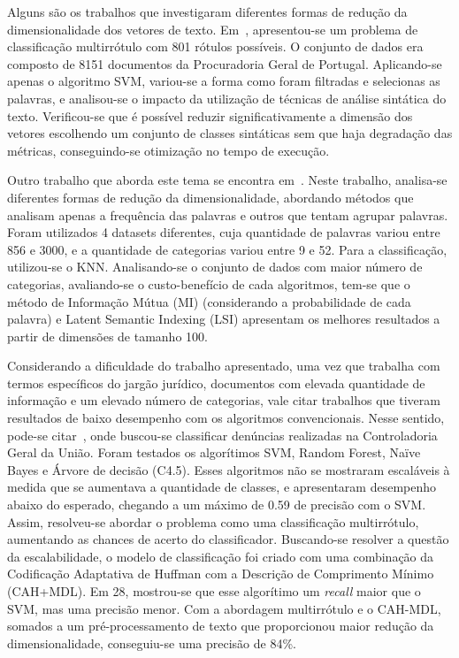 

Alguns são os trabalhos que investigaram diferentes formas de redução da dimensionalidade dos vetores de texto. Em~\cite{goncalves_is_2005}, apresentou-se um problema de classificação multirrótulo com 801 rótulos possíveis. O conjunto de dados era composto de 8151 documentos da Procuradoria Geral de Portugal. Aplicando-se apenas o algoritmo SVM, variou-se a forma como foram filtradas e selecionas as palavras, e analisou-se o impacto da utilização de técnicas de análise sintática do texto. Verificou-se que é possível reduzir significativamente a dimensão dos vetores escolhendo um conjunto de classes sintáticas sem que haja degradação das métricas, conseguindo-se otimização no tempo de execução. 

Outro trabalho que aborda este tema se encontra em~\cite{ciarelli_agglomeration_2009}. Neste trabalho, analisa-se diferentes formas de redução da dimensionalidade, abordando métodos que analisam apenas a frequência das palavras e outros que tentam agrupar palavras. Foram utilizados 4 datasets diferentes, cuja quantidade de palavras variou entre 856 e 3000, e a quantidade de categorias variou entre 9 e 52. Para a classificação, utilizou-se o KNN. Analisando-se o conjunto de dados com maior número de categorias, avaliando-se o custo-benefício de cada algoritmos, tem-se que o método de Informação Mútua (MI) (considerando a probabilidade de cada palavra) e Latent Semantic Indexing (LSI) apresentam os melhores resultados a partir de dimensões de tamanho 100.

Considerando a dificuldade do trabalho apresentado, uma vez que trabalha com termos específicos do jargão jurídico, documentos com elevada quantidade de informação e um elevado número de categorias, vale citar trabalhos que tiveram resultados de baixo desempenho com os algoritmos convencionais. Nesse sentido, pode-se citar~\cite{ladeirahuffman}, onde buscou-se classificar denúncias realizadas na Controladoria Geral da União. Foram testados os algorítimos SVM, Random Forest, Naïve Bayes e Árvore de decisão (C4.5). Esses algoritmos não se mostraram escaláveis à medida que se aumentava a quantidade de classes, e apresentaram desempenho abaixo do esperado, chegando a um máximo de 0.59 de precisão com o SVM. 
Assim, resolveu-se abordar o problema como uma classificação multirrótulo, aumentando as chances de acerto do classificador. Buscando-se resolver a questão da escalabilidade, o modelo de classificação foi criado com uma combinação da Codificação Adaptativa de Huffman com a Descrição de Comprimento Mínimo (CAH+MDL). Em 28, mostrou-se que esse algorítimo um \textit{recall} maior que o SVM, mas uma precisão menor. Com a abordagem multirrótulo e o CAH-MDL, somados a um pré-processamento de texto que proporcionou maior redução da dimensionalidade, conseguiu-se uma precisão de 84\%.

